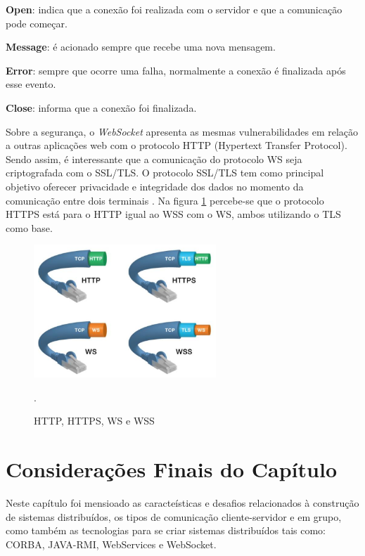 \documentclass[
	12pt,				%
	oneside,			%
	a4paper,			%
	english,			%
	brazil				%
	]{abntex2ppgsi}
\begin{document}
\begin{itemize*}
	\item{\textbf{Open}: indica que a conexão foi realizada com o servidor e que a comunicação pode começar.}
	\item{\textbf{Message}: é acionado sempre que recebe uma nova mensagem.}
	\item{\textbf{Error}: sempre que ocorre uma falha, normalmente a conexão é finalizada após esse evento.}
	\item{\textbf{Close}: informa que a conexão foi finalizada.}
\end{itemize*}

Sobre a segurança, o \textit{WebSocket} apresenta as mesmas vulnerabilidades em relação a outras aplicações web com o protocolo HTTP (Hypertext Transfer Protocol). Sendo assim, é interessante que a comunicação do protocolo WS seja criptografada com o SSL/TLS.  O protocolo SSL/TLS tem como principal objetivo oferecer privacidade e integridade dos dados no momento da comunicação entre dois terminais \cite{themudo2014implementaccao}. Na figura \ref{fig:wss_https} percebe-se que o protocolo HTTPS está para o HTTP igual ao WSS com o WS, ambos utilizando o TLS como base.

\begin{figure}[h!]
	\centering
	\includegraphics[height=5cm]{images/wss_https.png}
	\caption{HTTP, HTTPS, WS e WSS \cite{themudo2014implementaccao}}.
	\label{fig:wss_https}
\end{figure}

\section{Considerações Finais do Capítulo}
 
Neste capítulo foi mensioado as caracteísticas e desafios relacionados à construção de sistemas distribuídos, os tipos de comunicação cliente-servidor e em grupo, como também as tecnologias para se criar sistemas distribuídos tais como: CORBA, JAVA-RMI, WebServices e WebSocket.
\end{document}
